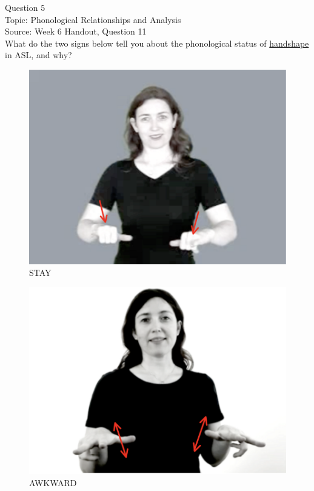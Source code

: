 \documentclass[12pt]{article}
\begin{document}
{\large Question 5}\\

Topic: Phonological Relationships and Analysis\\
Source: Week 6 Handout, Question 11\\

What do the two signs below tell you about the phonological status of \underline{handshape} in ASL, and why?\\

\begin{figure}[H]
\includegraphics{../images/asl_stay.png}
\caption{STAY}
\end{figure}
\begin{figure}[H]
\includegraphics{../images/asl_awkward.png}
\caption{AWKWARD}
\end{figure}
\end{document}
